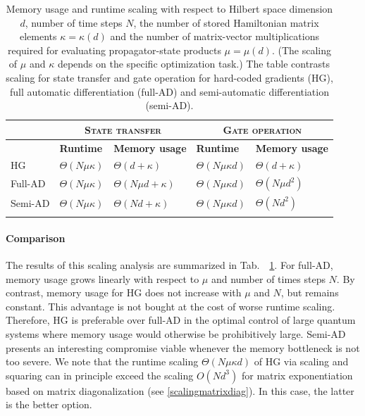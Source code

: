 \documentclass[12pt]{article}
\begin{document}
\begin{table}[ht]
\renewcommand{\arraystretch}{1.5}
\centering %
\caption{Memory usage and runtime scaling with respect to Hilbert space dimension $d$, number of time steps $N$,  the number of stored Hamiltonian matrix elements $\kappa=\kappa(d)$ and the number of matrix-vector multiplications required for evaluating propagator-state products $\mu=\mu(d)$. (The scaling of $\mu$ and $\kappa$ depends on the specific optimization task.) The table contrasts scaling for state transfer and gate operation for hard-coded gradients (HG), full automatic differentiation (full-AD) and semi-automatic differentiation (semi-AD). } %
\begin{tabular}
{p{}p{}p{}p{}p{}} 
\hline
\hline
& \multicolumn{2}{c}{\textbf{\textsc{State transfer}}} & \multicolumn{2}{c}{\textbf{\textsc{Gate operation}}}\\
\hline 
& \textbf{Runtime} & \textbf{Memory usage} & \textbf{Runtime} & \textbf{Memory usage}
\\
\hline
HG & $\Theta(N\mu \kappa)$ & $\Theta(d+\kappa)$ & $\Theta(N\mu \kappa d)$ & $\Theta(d+\kappa)$\\ 
Full-AD & $\Theta(N\mu \kappa)$ & $\Theta(N\mu d+\kappa)$ & $\Theta(N\mu \kappa d)$ & $\Theta(N\mu d^2)$  \\
Semi-AD & $\Theta(N\mu \kappa)$ & $\Theta(Nd+\kappa)$ & $\Theta(N\mu \kappa d)$ & $\Theta(Nd^2)$\\ 
\hline \hline
\label{scalingtable}
\end{tabular} 
\label{tablescaling}
\end{table}

\paragraph{Comparison}
The results of this scaling analysis are summarized in Tab.\ \ \ref{tablescaling}. For full-AD, memory usage grows linearly with respect to $\mu$ and number of times steps $N$. By contrast, memory usage for HG does not increase with $\mu$ and $N$, but remains constant. This advantage is not bought at the cost of worse runtime scaling. Therefore, HG is preferable over full-AD in the optimal control of large quantum systems where memory usage would otherwise be prohibitively large. Semi-AD presents an interesting compromise viable whenever the memory bottleneck is not too severe. We note that the runtime scaling $\Theta(N\mu\kappa d)$ of HG via scaling and squaring can in principle exceed the scaling $O(Nd^3)$ for matrix exponentiation based on matrix diagonalization (see  \ref{scalingmatrixdiag}). In this case, the latter is the better option.
\end{document}
